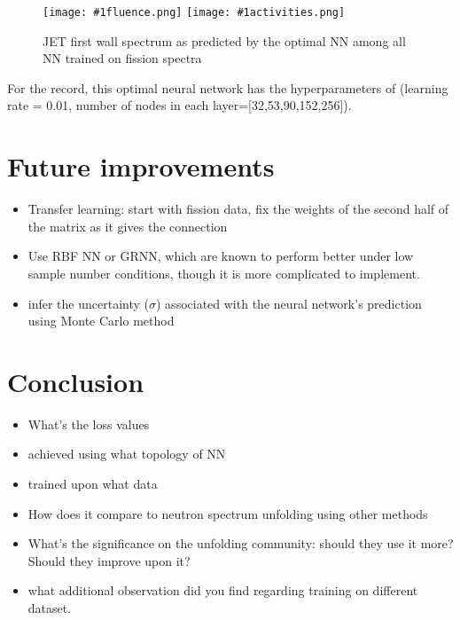 \documentclass[a4paper, 12pt]{article}
\newcommand{\fluenceandactivities}[1]{
\texttt{[image: \#1fluence.png]}
\texttt{[image: \#1activities.png]}
}
\begin{document}
\begin{figure}
\centering
\fluenceandactivities{/home/ocean/Documents/GitHubDir/unfolding/unfolding/unfoldingsuite/neuralnetwork/realoutputEarlyStopping/SelectedNNreplicated/fission-fusion/0918_0325_5_layer_test_mse_1_test_016_}
\caption{JET first wall spectrum as predicted by the optimal NN among all NN trained on fission spectra}\label{fission-fusionGood}
\end{figure}

For the record, this optimal neural network has the hyperparameters of (learning rate = 0.01, number of nodes in each layer=[32,53,90,152,256]).

\section{Future improvements}
\begin{itemize}
    \item Transfer learning: start with fission data, fix the weights of the second half of the matrix as it gives the connection
    \item Use RBF NN or GRNN, which are known to perform better under low sample number conditions, though it is more complicated to implement.
    \item infer the uncertainty ($\sigma$) associated with the neural network's prediction using Monte Carlo method
\end{itemize}

\section{Conclusion}
\begin{itemize}
    \item What's the loss values
    \item achieved using what topology of NN
    \item trained upon what data
    \item How does it compare to neutron spectrum unfolding using other methods
    \item What's the significance on the unfolding community: should they use it more? Should they improve upon it?
    \item what additional observation did you find regarding training on different dataset.
\end{itemize}




\end{document}
